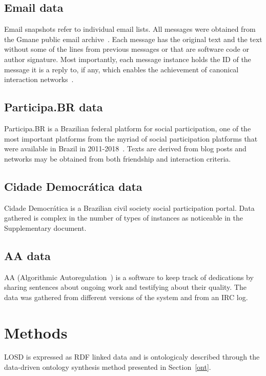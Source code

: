 \documentclass[data,datadescriptor,submit,moreauthors,pdftex]{Definitions/mdpi}
\begin{document}
\subsection{Email data}
Email snapshots refer to individual email lists.
All messages were obtained from the Gmane public email archive~\cite{gmane}.
Each message has the original text and the text without some of the lines
from previous messages or that are software code or author signature.
Most importantly, each message instance holds the ID of the message it is
a reply to, if any, which enables the achievement of canonical interaction networks~\cite{bird,stab}.

\subsection{Participa.BR data}
Participa.BR is a Brazilian federal platform for social participation,
one of the most important platforms from the myriad of social participation platforms
that were available in Brazil in 2011-2018~\cite{spbr}.
Texts are derived from blog posts and networks may be obtained from
both friendship and interaction criteria.

\subsection{Cidade Democrática data}
Cidade Democrática is a Brazilian civil society social participation portal.
Data gathered is complex in the number of types of instances
as noticeable in the Supplementary document.

\subsection{AA data}
AA (Algorithmic Autoregulation~\cite{aa,aa2}) is a software to keep track of dedications by
sharing sentences about ongoing work and testifying about their quality.
The data was gathered from different versions of the system and from an IRC
log.
 

\section{Methods}\label{methods}
LOSD is expressed as RDF linked data
and is ontologicaly described through the
data-driven ontology synthesis method presented in Section~\ref{ont}.
\end{document}
